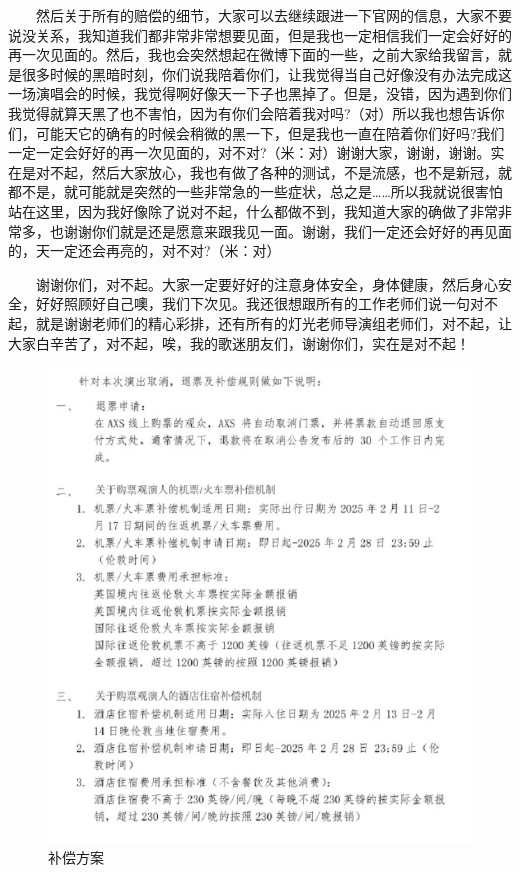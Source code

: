 \documentclass[]{ctexbook}
\begin{document}
  然后关于所有的赔偿的细节，大家可以去继续跟进一下官网的信息，大家不要说没关系，我知道我们都非常非常想要见面，但是我也一定相信我们一定会好好的再一次见面的。然后，我也会突然想起在微博下面的一些，之前大家给我留言，就是很多时候的黑暗时刻，你们说我陪着你们，让我觉得当自己好像没有办法完成这一场演唱会的时候，我觉得啊好像天一下子也黑掉了。但是，没错，因为遇到你们我觉得就算天黑了也不害怕，因为有你们会陪着我对吗?（对）所以我也想告诉你们，可能天它的确有的时候会稍微的黑一下，但是我也一直在陪着你们好吗?我们一定一定会好好的再一次见面的，对不对?（米：对）谢谢大家，谢谢，谢谢。实在是对不起，然后大家放心，我也有做了各种的测试，不是流感，也不是新冠，就都不是，就可能就是突然的一些非常急的一些症状，总之是\ldots\ldots 所以我就说很害怕站在这里，因为我好像除了说对不起，什么都做不到，我知道大家的确做了非常非常多，也谢谢你们就是还是愿意来跟我见一面。谢谢，我们一定还会好好的再见面的，天一定还会再亮的，对不对?（米：对）

  谢谢你们，对不起。大家一定要好好的注意身体安全，身体健康，然后身心安全，好好照顾好自己噢，我们下次见。我还很想跟所有的工作老师们说一句对不起，就是谢谢老师们的精心彩排，还有所有的灯光老师导演组老师们，对不起，让大家白辛苦了，对不起，唉，我的歌迷朋友们，谢谢你们，实在是对不起！

\begin{figure}

{\centering \includegraphics[width=400pt]{img/london20250214/compensation} 

}

\caption{补偿方案}\label{fig:unnamed-chunk-173}
\end{figure}
\end{document}
